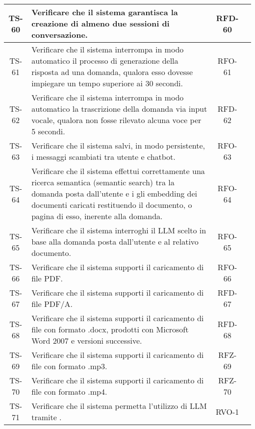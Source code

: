 \begin{xltabular}{\textwidth}{| c | X | c | c |}
    \hline
    TS-60 & Verificare che il sistema garantisca la creazione di almeno due sessioni di conversazione. & RFD-60 & \textcolor{xmarkcolor}{} \\
    \hline
    TS-61 & Verificare che il sistema interrompa in modo automatico il processo di generazione della risposta ad una domanda, qualora esso dovesse impiegare un tempo superiore ai 30 secondi. & RFO-61 & \textcolor{xmarkcolor}{} \\
    \hline
    TS-62 & Verificare che il sistema interrompa in modo automatico la trascrizione della domanda via input vocale, qualora non fosse rilevato alcuna voce per 5 secondi. & RFD-62 & \textcolor{xmarkcolor}{} \\
    \hline
    TS-63 & Verificare che il sistema salvi, in modo persistente, i messaggi scambiati tra utente e chatbot. & RFO-63 & \textcolor{xmarkcolor}{} \\
    \hline
    TS-64 & Verificare che il sistema effettui correttamente una ricerca semantica (semantic search) tra la domanda posta dall'utente e i gli embedding dei documenti caricati restituendo il documento, o pagina di esso, inerente alla domanda. & RFO-64 & \textcolor{xmarkcolor}{} \\
    \hline
    TS-65 & Verificare che il sistema interroghi il LLM scelto in base alla domanda posta dall'utente e al relativo documento. & RFO-65 & \textcolor{xmarkcolor}{} \\
    \hline
    TS-66 & Verificare che il sistema supporti il caricamento di file PDF. & RFO-66 & \textcolor{xmarkcolor}{} \\
    \hline
    TS-67 & Verificare che il sistema supporti il caricamento di file PDF/A. & RFD-67 & \textcolor{xmarkcolor}{} \\
    \hline
    TS-68 & Verificare che il sistema supporti il caricamento di file con formato .docx, prodotti con Microsoft Word 2007 e versioni successive. & RFD-68 & \textcolor{xmarkcolor}{} \\
    \hline
    TS-69 & Verificare che il sistema supporti il caricamento di file con formato .mp3. & RFZ-69 & \textcolor{xmarkcolor}{} \\
    \hline
    TS-70 & Verificare che il sistema supporti il caricamento di file con formato .mp4. & RFZ-70 & \textcolor{xmarkcolor}{} \\
    \hline
    TS-71 & Verificare che il sistema permetta l'utilizzo di LLM tramite . & RVO-1 & \textcolor{xmarkcolor}{}\\

\end{xltabular}
